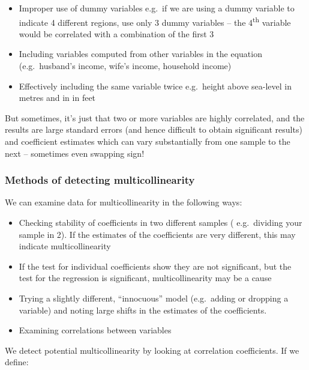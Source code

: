 \documentclass[12pt,a4paper,openany,twoside]{report}
\theoremstyle{definition}
\theoremstyle{remark}
\theoremstyle{plain}
\theoremstyle{definition}
\theoremstyle{definition}
\theoremstyle{definition}
\theoremstyle{remark}
\begin{document}
\begin{itemize}
\item
  Improper use of dummy variables e.g.~if we are using a dummy variable
  to indicate 4 different regions, use only 3 dummy variables -- the
  4\textsuperscript{th} variable would be correlated with a combination
  of the first 3
\item
  Including variables computed from other variables in the equation
  (e.g.~husband's income, wife's income, household income)
\item
  Effectively including the same variable twice e.g.~height above
  sea-level in metres and in in feet
\end{itemize}

But sometimes, it's just that two or more variables are highly
correlated, and the results are large standard errors (and hence
difficult to obtain significant results) and coefficient estimates which
can vary substantially from one sample to the next -- sometimes even
swapping sign!

\hypertarget{methods-of-detecting-multicollinearity}{%
\subsubsection*{Methods of detecting multicollinearity}\label{methods-of-detecting-multicollinearity}}

We can examine data for multicollinearity in the following ways:

\begin{itemize}
\item
  Checking stability of coefficients in two different samples (
  e.g.~dividing your sample in 2). If the estimates of the coefficients are
  very different, this may indicate multicollinearity
\item
  If the test for individual coefficients show they are not significant,
  but the test for the regression is significant, multicollinearity may
  be a cause
\item
  Trying a slightly different, ``innocuous'' model (e.g.~adding or
  dropping a variable) and noting large shifts in the estimates of the
  coefficients.
\item
  Examining correlations between variables
\end{itemize}

We detect potential multicollinearity by looking at correlation
coefficients. If we define:
\end{document}
